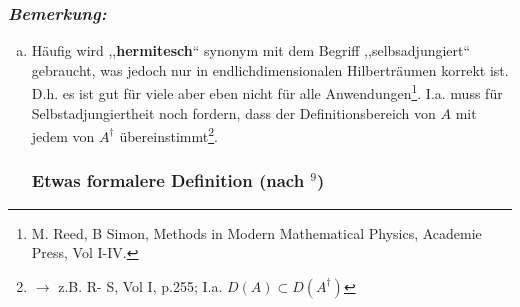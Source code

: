 \subsubsection*{\emph{Bemerkung:}}







\begin{enumerate}[(a)]
	\item Häufig wird ,,\textbf{hermitesch}`` synonym mit dem Begriff ,,selbsadjungiert`` gebraucht, was jedoch nur in endlichdimensionalen Hilberträumen korrekt ist. D.h. es ist gut für viele aber eben nicht für alle Anwendungen\footnote{M. Reed, B Simon, Methods in Modern Mathematical Physics, Academie Press, Vol I-IV.}. I.a. muss für Selbstadjungiertheit noch fordern, dass der Definitionsbereich von $ A $ mit jedem von $ A^\dagger $ übereinstimmt\footnote{$ \to $ z.B. R- S, Vol I, p.255; I.a. $ D(A) \subset D(A^\dagger) $}.
	
	\subsubsection{Etwas formalere Definition (nach \texorpdfstring{$ ^9 $}{9})}
	

\end{enumerate}
